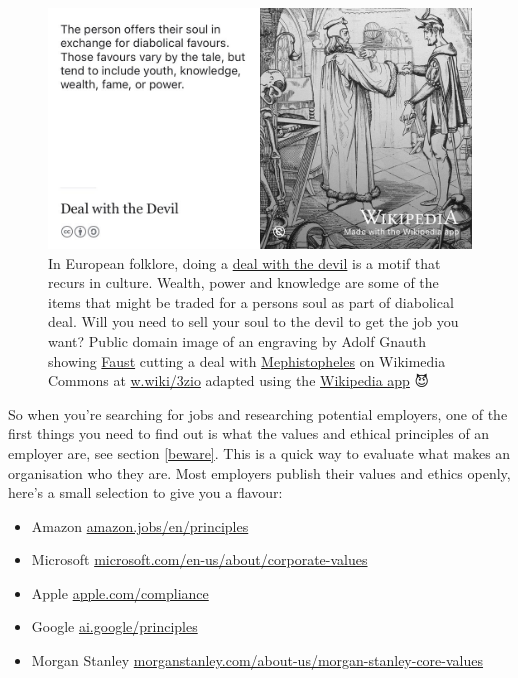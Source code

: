 \documentclass[
]{book}
\providecommand{\tightlist}{%
  \setlength{\itemsep}{0pt}\setlength{\parskip}{0pt}}
\begin{document}
\begin{figure}

{\centering \includegraphics[width=1\linewidth]{images/deal-with-the-devil} 

}

\caption{In European folklore, doing a \href{https://en.wikipedia.org/wiki/Deal_with_the_Devil}{deal with the devil} is a motif that recurs in culture. Wealth, power and knowledge are some of the items that might be traded for a persons soul as part of diabolical deal. Will you need to sell your soul to the devil to get the job you want? Public domain image of an engraving by Adolf Gnauth showing \href{https://en.wikipedia.org/wiki/Faust}{Faust} cutting a deal with \href{https://en.wikipedia.org/wiki/Mephistopheles}{Mephistopheles} on Wikimedia Commons at \href{https://w.wiki/3zio}{w.wiki/3zio} adapted using the \href{https://apps.apple.com/gb/app/wikipedia/id324715238}{Wikipedia app} 😈}\label{fig:diabolical-fig}
\end{figure}



So when you're searching for jobs and researching potential employers, one of the first things you need to find out is what the values and ethical principles of an employer are, see section \ref{beware}. This is a quick way to evaluate what makes an organisation who they are. Most employers publish their values and ethics openly, here's a small selection to give you a flavour:

\begin{itemize}
\tightlist
\item
  Amazon \href{https://www.amazon.jobs/en/principles}{amazon.jobs/en/principles}
\item
  Microsoft \href{https://www.microsoft.com/en-us/about/corporate-values}{microsoft.com/en-us/about/corporate-values}
\item
  Apple \href{https://www.apple.com/compliance/}{apple.com/compliance}
\item
  Google \href{https://ai.google/principles/}{ai.google/principles}
\item
  Morgan Stanley \href{https://www.morganstanley.com/about-us/morgan-stanley-core-values}{morganstanley.com/about-us/morgan-stanley-core-values}
\end{itemize}
\end{document}
